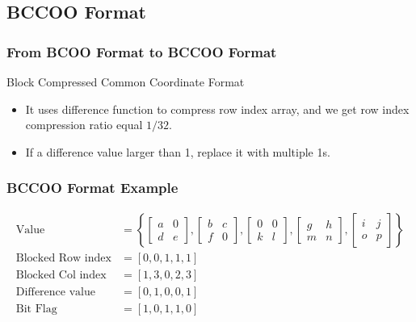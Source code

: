 \subsection{BCCOO Format}
\begin{frame}
	\frametitle{From BCOO Format to BCCOO Format}
		Block Compressed Common Coordinate Format
		\begin{itemize}
			\item It uses difference function to compress row index array, and
				we get row index compression ratio equal $1/32$.
			\item If a difference value larger than 1, replace it with multiple 1s.
		\end{itemize}
\end{frame}

\begin{frame}
	\frametitle{BCCOO Format Example}
	
\begin{align*}
	\text{Value} &= \left \{ \begin{bmatrix}
	a & 0\\ 
	d & e
	\end{bmatrix}, 
	\begin{bmatrix}
	b & c\\ 
	f & 0
	\end{bmatrix}, 
	\begin{bmatrix}
	0 & 0\\ 
	k & l
	\end{bmatrix}, 
	\begin{bmatrix}
	g & h\\ 
	m & n
	\end{bmatrix}, 
	\begin{bmatrix}
	i & j\\ 
	o & p
	\end{bmatrix}
	\right \} \\
	\text{Blocked Row index} &= [0, 0, 1, 1, 1] \\
	\text{Blocked Col index} &= [1, 3, 0, 2, 3] \\
	\text{Difference value}  &= [0, 1, 0, 0, 1] \\
	\text{Bit Flag}			 &= [1, 0, 1, 1, 0]	\\
\end{align*}

\end{frame}

